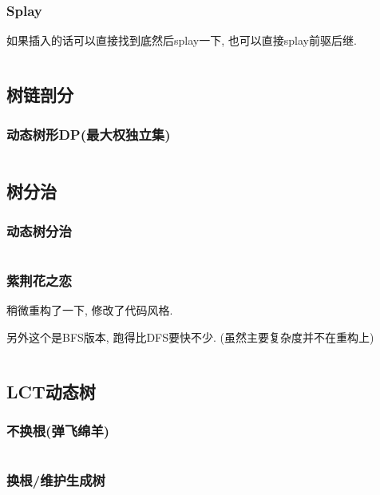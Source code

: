 \documentclass[a4paper, twoside]{article}
\begin{document}
\begin{multicols}{2}
				\subsubsection{Splay}
					如果插入的话可以直接找到底然后splay一下, 也可以直接splay前驱后继.
					\inputminted{cpp}{../src/datastructure/文艺平衡树.cpp}
				
			\subsection{树链剖分}
				\subsubsection{动态树形DP(最大权独立集)}
					\inputminted{cpp}{../src/datastructure/动态树形DP.cpp}
				
			\subsection{树分治}

				
				\subsubsection{动态树分治}
					\inputminted{cpp}{../src/datastructure/动态树分治.cpp}

				\subsubsection{紫荆花之恋}
					稍微重构了一下, 修改了代码风格.

					另外这个是BFS版本, 跑得比DFS要快不少. (虽然主要复杂度并不在重构上)
					\inputminted{cpp}{../src/datastructure/紫荆花之恋.cpp}
	
			\subsection{LCT动态树}
				\subsubsection{不换根(弹飞绵羊)}
					\inputminted{cpp}{../src/datastructure/LCT(不换根).cpp}
			
				\subsubsection{换根/维护生成树}
					\inputminted{cpp}{../src/datastructure/LCT(换根).cpp}


\end{multicols}
\end{document}
